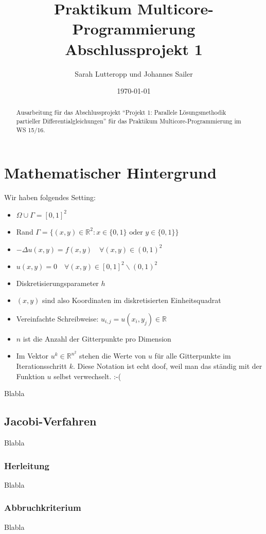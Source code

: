 \documentclass{article}
\title{Praktikum Multicore-Programmierung \\ Abschlussprojekt 1}
\author{Sarah Lutteropp und Johannes Sailer}
\date{\today}
\begin{document}
\maketitle


\begin{abstract}
Ausarbeitung für das Abschlussprojekt ``Projekt 1: Parallele Lösungsmethodik partieller Differentialgleichungen'' für das Praktikum Multicore-Programmierung im WS 15/16.
\end{abstract}

\section{Mathematischer Hintergrund}

Wir haben folgendes Setting:
\begin{itemize}
	\item $\Omega \cup \Gamma = [0,1]^2$
	\item Rand $\Gamma = \{(x,y) \in \mathbb{R}^2 : x \in \{0,1\} \text{ oder }  y \in \{0,1\} \}$
	\item $-\Delta u(x,y) = f(x,y) \quad \forall (x,y) \in (0,1)^2$
	\item $u(x,y) = 0 \quad \forall (x,y) \in [0,1]^2 \backslash (0,1)^2$
	
	\item Diskretisierungsparameter $h$
	\item $(x,y)$ sind also Koordinaten im diskretisierten Einheitsquadrat
	\item Vereinfachte Schreibweise: $u_{i,j} = u(x_i, y_j) \in \mathbb{R}$
	\item $n$ ist die Anzahl der Gitterpunkte pro Dimension
	\item Im Vektor $u^k \in \mathbb{R}^{n^2}$ stehen die Werte von $u$ für alle Gitterpunkte im Iterationsschritt $k$. Diese Notation ist echt doof, weil man das ständig mit der Funktion $u$ selbst verwechselt. :-(
\end{itemize}

Blabla
\subsection{Jacobi-Verfahren}
Blabla
\subsubsection{Herleitung}
Blabla
\subsubsection{Abbruchkriterium}
Blabla
\end{document}
